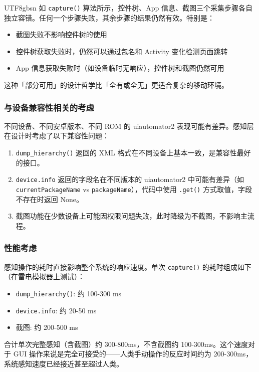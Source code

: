 \documentclass{article}
\begin{document}
\begin{CJK}{UTF8}{gbsn}
如 \texttt{capture()} 算法所示，控件树、App 信息、截图三个采集步骤各自独立容错。任何一个步骤失败，其余步骤的结果仍然有效。特别是：

\begin{itemize}
  \item 截图失败不影响控件树的使用
  \item 控件树获取失败时，仍然可以通过包名和 Activity 变化检测页面跳转
  \item App 信息获取失败时（如设备临时无响应），控件树和截图仍然可用
\end{itemize}

这种「部分可用」的设计哲学比「全有或全无」更适合复杂的移动环境。

\subsubsection{与设备兼容性相关的考虑}

不同设备、不同安卓版本、不同 ROM 的 uiautomator2 表现可能有差异。感知层在设计时考虑了以下兼容性问题：

\begin{enumerate}[leftmargin=1.5em]
  \item \texttt{dump\_hierarchy()} 返回的 XML 格式在不同设备上基本一致，是兼容性最好的接口。
  \item \texttt{device.info} 返回的字段名在不同版本的 uiautomator2 中可能有差异（如 \texttt{currentPackageName} vs \texttt{packageName}），代码中使用 \texttt{.get()} 方式取值，字段不存在时返回 None。
  \item 截图功能在少数设备上可能因权限问题失败，此时降级为不截图，不影响主流程。
\end{enumerate}

\subsubsection{性能考虑}

感知操作的耗时直接影响整个系统的响应速度。单次 \texttt{capture()} 的耗时组成如下（在雷电模拟器上测试）：

\begin{itemize}
  \item \texttt{dump\_hierarchy()}: 约 100-300 ms
  \item \texttt{device.info}: 约 20-50 ms
  \item 截图: 约 200-500 ms
\end{itemize}

合计单次完整感知（含截图）约 300-800ms，不含截图约 100-300ms。这个速度对于 GUI 操作来说是完全可接受的——人类手动操作的反应时间约为 200-300ms，系统感知速度已经接近甚至超过人类。


\end{CJK}
\end{document}
